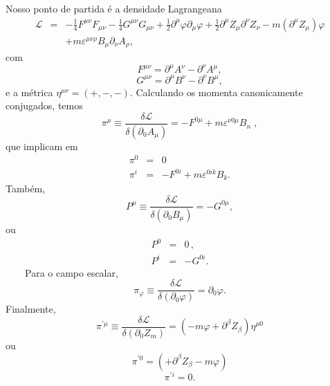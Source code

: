 \documentclass[a4paper,thmsa,12pt]{report}
\begin{document}
Nosso ponto de partida \'{e} a densidade Lagrangeana 
\begin{eqnarray}
\mathcal{L} &=&-\frac{1}{4}F^{\mu \nu }F_{\mu \nu }-\frac{1}{4}G^{\mu \nu
}G_{\mu \nu }+\frac{1}{2}\partial ^{\mu }\varphi \partial _{\mu }\varphi +%
\frac{1}{2}\partial ^{\mu }Z_{\mu }\partial ^{\nu }Z_{\nu }-m\left( \partial
^{\mu }Z_{\mu }\right) \varphi   \nonumber \\
&&+m\varepsilon ^{\mu \nu \rho }B_{\mu }\partial _{\nu }A_{\rho },
\label{344}
\end{eqnarray}
com 
\begin{equation}
F^{\mu \nu }=\partial ^{\mu }A^{\nu }-\partial ^{\nu }A^{\mu },
\label{345.a}
\end{equation}
\begin{equation}
G^{\mu \nu }=\partial ^{\mu }B^{\nu }-\partial ^{\nu }B^{\mu },
\label{345.b}
\end{equation}
e a m\'{e}trica $\eta ^{\mu \nu }=(+,-,-)$. Calculando os momenta
canonicamente conjugados, temos 
\begin{equation}
\pi ^{\mu }\equiv \frac{\delta \mathcal{L}}{\delta \left( \partial
_{0}A_{\mu }\right) }=-F^{0\mu }+m\varepsilon ^{\nu 0\mu }B_{n}\;,
\label{346}
\end{equation}
que implicam em 
\begin{eqnarray}
\pi ^{0}&=&0  \label{347.a}\\
\pi ^{i}&=&-F^{0i}+m\varepsilon ^{0ik}B_{k}.  \label{347.b}
\end{eqnarray}
Tamb\'{e}m, 
\begin{equation}
P^{\mu }\equiv \frac{\delta \mathcal{L}}{\delta \left( \partial _{0}B_{\mu
}\right) }=-G^{0\mu },  \label{348}
\end{equation}
ou 
\begin{eqnarray}
P^{0}&=&0 \, ,  \label{349.a}\\
P^{i}&=&-G^{0i}.  \label{349.b}
\end{eqnarray}
\ \ \ \ Para o campo escalar, 
\begin{equation}
\pi _{\varphi }\equiv \frac{\delta \mathcal{L}}{\delta \left( \partial
_{0}\varphi \right) }=\partial _{0}\varphi .  \label{350}
\end{equation}
Finalmente, 
\begin{equation}
\pi ^{\prime \mu }\equiv \frac{\delta \mathcal{L}}{\delta \left( \partial
_{0}Z_{m}\right) }=\left( -m\varphi +\partial ^{\beta }Z_{\beta }\right)
\eta ^{\mu 0}  \label{351}
\end{equation}
ou 
\begin{equation}
\pi ^{\prime 0}=\left( +\partial ^{\beta }Z_{\beta }-m\varphi \right) 
\label{352.a}
\end{equation}
\begin{equation}
\pi ^{\prime i}=0.  \label{352.b}
\end{equation}
\end{document}
